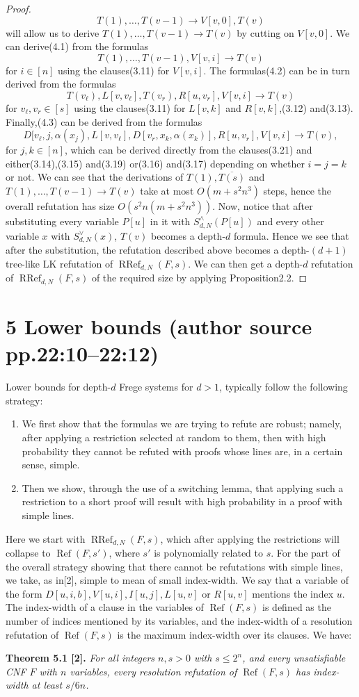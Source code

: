 \documentclass[10pt,a4paper]{article}
\newcommand{\RRef}{\operatorname{RRef}}
\renewcommand{\Ref}{\operatorname{Ref}}
\newenvironment{originalresult}[1]{\par\medskip\noindent\textbf{#1.}\itshape}{\par\medskip}
\begin{document}
\begin{proof}
\[T(1),\ldots,T(v-1)\to V[v,0],T(v)\tag{4.1}\]
will allow us to derive $T(1),\ldots,T(v-1)\to T(v)$ by cutting on $V[v,0]$. We can derive(4.1) from the formulas
\[T(1),\ldots,T(v-1),V[v,i]\to T(v)\tag{4.2}\]
for $i\in[n]$ using the clauses(3.11) for $V[v,i]$. The formulas(4.2) can be in turn derived from the formulas
\[T(v_\ell),L[v,v_\ell],T(v_r),R[u,v_r],V[v,i]\to T(v)\tag{4.3}\]
for $v_\ell,v_r\in[s]$ using the clauses(3.11) for $L[v,k]$ and $R[v,k]$,(3.12) and(3.13). Finally,(4.3) can be derived from the formulas
\[D[v_\ell,j,\alpha(x_j),L[v,v_\ell],D[v_r,x_k,\alpha(x_k)],R[u,v_r],V[v,i]\to T(v),\tag{4.4}\]
for $j,k\in[n]$, which can be derived directly from the clauses(3.21) and either(3.14),(3.15) and(3.19) or(3.16) and(3.17) depending on whether $i=j=k$ or not.
We can see that the derivations of $T(1),\overline{T(s)}$ and $T(1),\ldots,T(v-1)\to T(v)$ take at most $O(m+s^2n^3)$ steps, hence the overall refutation has size $O(s^2n(m+s^2n^3))$.
Now, notice that after substituting every variable $P[u]$ in it with $S_{d,N}^{\wedge}(P[u])$ and every other variable $x$ with $S_{d,N}^{\vee}(x)$, $T(v)$ becomes a depth-$d$ formula. Hence we see that after the substitution, the refutation described above becomes a depth-$(d+1)$ tree-like LK refutation of $\RRef_{d,N}(F,s)$. We can then get a depth-$d$ refutation of $\RRef_{d,N}(F,s)$ of the required size by applying Proposition2.2.
\end{proof}

\section*{5 Lower bounds (author source pp.22:10--22:12)}
Lower bounds for depth-$d$ Frege systems for $d>1$, typically follow the following strategy:
\begin{enumerate}\item We first show that the formulas we are trying to refute are robust; namely, after applying a restriction selected at random to them, then with high probability they cannot be refuted with proofs whose lines are, in a certain sense, simple.\item Then we show, through the use of a switching lemma, that applying such a restriction to a short proof will result with high probability in a proof with simple lines.\end{enumerate}
Here we start with $\RRef_{d,N}(F,s)$, which after applying the restrictions will collapse to $\Ref(F,s')$, where $s'$ is polynomially related to $s$. For the part of the overall strategy showing that there cannot be refutations with simple lines, we take, as in[2], simple to mean of small index-width. We say that a variable of the form $D[u,i,b],V[u,i],I[u,j],L[u,v]$ or $R[u,v]$ mentions the index $u$. The index-width of a clause in the variables of $\Ref(F,s)$ is defined as the number of indices mentioned by its variables, and the index-width of a resolution refutation of $\Ref(F,s)$ is the maximum index-width over its clauses. We have:
\begin{originalresult}{Theorem 5.1 [2]}
For all integers $n,s>0$ with $s\le2^n$, and every unsatisfiable CNF $F$ with $n$ variables, every resolution refutation of $\Ref(F,s)$ has index-width at least $s/6n$.
\end{originalresult}
\end{document}
